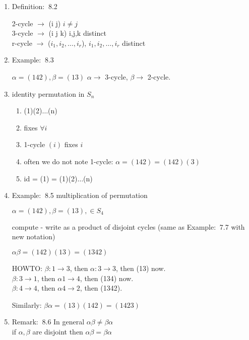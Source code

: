 \documentclass[12pt]{article}
\newcommand{\defi}{{\color{blue} Definition: $\ $}}
\newcommand{\exe}{{\color{green} Example: $\ $}}
\newcommand{\rem}{{\color{blue} Remark: $\ $}}
\begin{document}
\begin{enumerate}
\begin{enumerate}
        \item \defi 8.2 
    
        2-cycle $\rightarrow$ (i j) $i\ne j$ \\
        3-cycle $\rightarrow$ (i j k) i,j,k distinct \\
        r-cycle $\rightarrow$ ($i_1, i_2, \dots, i_r$),  $i_1, i_2, \dots, i_r$ distinct

        \item \exe 8.3
    
        $\alpha = (142), \beta = (13)$
        $\alpha \rightarrow$ 3-cycle, $\beta \rightarrow$ 2-cycle.

        \item identity permutation in $S_n$
    
        \begin{enumerate}
            \item (1)(2)$\dots$(n)
            
            \item fixes $\forall i$
            
            \item 1-cycle $(i)$ fixes $i$
            
            \item often we do not note 1-cycle: $\alpha = (142) = (142)(3)$
            
            \item id = (1) = (1)(2)$\dots$(n)
        \end{enumerate}

        \item \exe 8.5 multiplication of permutation
        
        $\alpha = (142), \beta = (13), \in S_4$

        compute - write as a product of disjoint cycles (same as \exe 7.7 with new notation)

        $\alpha\beta = (142)(13) = (1342)$

        HOWTO: $\beta: 1 \rightarrow 3$, then $\alpha: 3 \rightarrow 3$, then (13) now.\\
        $\beta: 3 \rightarrow 1$, then $\alpha 1 \rightarrow 4$, then (134) now.\\
        $\beta: 4 \rightarrow 4$, then $\alpha 4 \rightarrow 2$, then (1342).

        Similarly: $\beta\alpha = (13)(142) = (1423)$

        \item \rem 8.6
        In general $\alpha\beta \ne \beta\alpha$\\
        if $\alpha, \beta$ are disjoint then $\alpha\beta  = \beta\alpha$
        


\end{enumerate}
\end{enumerate}
\end{document}
